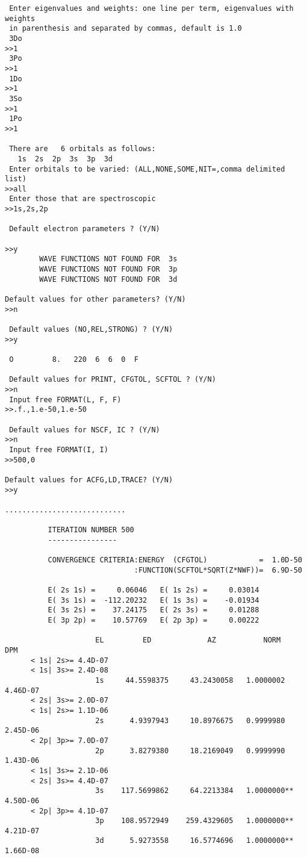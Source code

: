\documentclass[fleqn,10pt]{book}
\begin{document}
\begin{verbatim}
 Enter eigenvalues and weights: one line per term, eigenvalues with weights
 in parenthesis and separated by commas, default is 1.0
 3Do
>>1
 3Po
>>1
 1Do
>>1
 3So
>>1
 1Po
>>1 

 There are   6 orbitals as follows:
   1s  2s  2p  3s  3p  3d
 Enter orbitals to be varied: (ALL,NONE,SOME,NIT=,comma delimited list)
>>all
 Enter those that are spectroscopic
>>1s,2s,2p

 Default electron parameters ? (Y/N) 

>>y
        WAVE FUNCTIONS NOT FOUND FOR  3s
        WAVE FUNCTIONS NOT FOUND FOR  3p
        WAVE FUNCTIONS NOT FOUND FOR  3d

Default values for other parameters? (Y/N) 
>>n

 Default values (NO,REL,STRONG) ? (Y/N) 
>>y

 O         8.   220  6  6  0  F

 Default values for PRINT, CFGTOL, SCFTOL ? (Y/N) 
>>n
 Input free FORMAT(L, F, F) 
>>.f.,1.e-50,1.e-50

 Default values for NSCF, IC ? (Y/N) 
>>n
 Input free FORMAT(I, I) 
>>500,0

Default values for ACFG,LD,TRACE? (Y/N) 
>>y

............................

          ITERATION NUMBER 500
          ----------------

          CONVERGENCE CRITERIA:ENERGY  (CFGTOL)            =  1.0D-50
                              :FUNCTION(SCFTOL*SQRT(Z*NWF))=  6.9D-50

          E( 2s 1s) =     0.06046   E( 1s 2s) =     0.03014
          E( 3s 1s) =  -112.20232   E( 1s 3s) =    -0.01934
          E( 3s 2s) =    37.24175   E( 2s 3s) =     0.01288
          E( 3p 2p) =    10.57769   E( 2p 3p) =     0.00222

                     EL         ED             AZ           NORM       DPM
      < 1s| 2s>= 4.4D-07
      < 1s| 3s>= 2.4D-08
                     1s     44.5598375     43.2430058   1.0000002    4.46D-07
      < 2s| 3s>= 2.0D-07
      < 1s| 2s>= 1.1D-06
                     2s      4.9397943     10.8976675   0.9999980    2.45D-06
      < 2p| 3p>= 7.0D-07
                     2p      3.8279380     18.2169049   0.9999990    1.43D-06
      < 1s| 3s>= 2.1D-06
      < 2s| 3s>= 4.4D-07
                     3s    117.5699862     64.2213384   1.0000000**  4.50D-06
      < 2p| 3p>= 4.1D-07
                     3p    108.9572949    259.4329605   1.0000000**  4.21D-07
                     3d      5.9273558     16.5774696   1.0000000**  1.66D-08


\end{verbatim}
\end{document}
